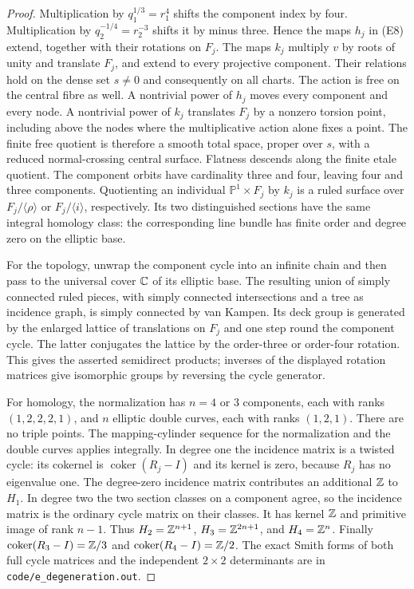 \begin{proof}
Multiplication by $q_1^{1/3}=r_1^4$ shifts the component index by four.
Multiplication by $q_2^{-1/4}=r_2^{-3}$ shifts it by minus three.
Hence the maps $h_j$ in (E8) extend, together with their rotations
on $F_j$. The maps $k_j$ multiply $v$ by roots of unity and translate
$F_j$, and extend to every projective component. Their relations
hold on the dense set $s\ne0$ and consequently on all charts.
The action is free on the central fibre as well. A nontrivial power
of $h_j$ moves every component and every node. A nontrivial power
of $k_j$ translates $F_j$ by a nonzero torsion point, including
above the nodes where the multiplicative action alone fixes a point.
The finite free quotient is therefore a smooth total space, proper
over $s$, with a reduced normal-crossing central surface. Flatness
descends along the finite etale quotient. The component orbits have
cardinality three and four, leaving four and three components.
Quotienting an individual $\mathbb P^1\times F_j$ by $k_j$ is a
ruled surface over $F_j/\langle\rho\rangle$ or
$F_j/\langle i\rangle$, respectively. Its two distinguished
sections have the same integral homology class: the corresponding
line bundle has finite order and degree zero on the elliptic base.

For the topology, unwrap the component cycle into an infinite chain
and then pass to the universal cover $\mathbb C$ of its elliptic base.
The resulting union of simply connected ruled pieces, with
simply connected intersections and a tree as incidence graph, is
simply connected by van Kampen. Its deck group is generated by
the enlarged lattice of translations on $F_j$ and one step round
the component cycle. The latter conjugates the lattice by the
order-three or order-four rotation. This gives the asserted
semidirect products; inverses of the displayed rotation matrices
give isomorphic groups by reversing the cycle generator.

For homology, the normalization has $n=4$ or $3$ components, each
with ranks $(1,2,2,2,1)$, and $n$ elliptic double curves, each with
ranks $(1,2,1)$. There are no triple points. The mapping-cylinder
sequence for the normalization and the double curves applies
integrally. In degree one the incidence matrix is a twisted cycle:
its cokernel is $\operatorname{coker}(R_j-I)$ and its kernel is
zero, because $R_j$ has no eigenvalue one. The degree-zero incidence
matrix contributes an additional $\mathbb Z$ to $H_1$. In degree two the
two section classes on a component agree, so the incidence matrix
is the ordinary cycle matrix on their classes. It has kernel
$\mathbb Z$ and primitive image of rank $n-1$. Thus $H_2=\mathbb Z^{n+1}$,
$H_3=\mathbb Z^{2n+1}$, and $H_4=\mathbb Z^n$. Finally
$\operatorname{coker}(R_3-I)=\mathbb Z/3$ and
$\operatorname{coker}(R_4-I)=\mathbb Z/2$. The exact Smith forms of both
full cycle matrices and the independent $2\times2$ determinants
are in \texttt{code/e\_degeneration.out}.
\end{proof}

